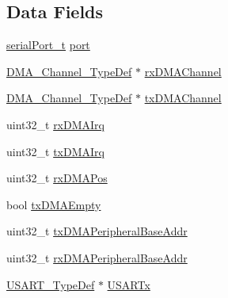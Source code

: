 \subsection*{Data Fields}
\begin{DoxyCompactItemize}
\item 
\hyperlink{drivers_2serial_8h_a64a5e2f04e1a908fbb1b3b165f88e0ef}{serial\+Port\+\_\+t} \hyperlink{structuartPort__t_ad41850c792e7215dc5e19d6850f256c3}{port}
\item 
\hyperlink{structDMA__Channel__TypeDef}{D\+M\+A\+\_\+\+Channel\+\_\+\+Type\+Def} $\ast$ \hyperlink{structuartPort__t_aab2466933b4f50a9683cf4e38b7339b2}{rx\+D\+M\+A\+Channel}
\item 
\hyperlink{structDMA__Channel__TypeDef}{D\+M\+A\+\_\+\+Channel\+\_\+\+Type\+Def} $\ast$ \hyperlink{structuartPort__t_acb3b9d625c78bfa9b6246854a0f9a7eb}{tx\+D\+M\+A\+Channel}
\item 
uint32\+\_\+t \hyperlink{structuartPort__t_a26bda335a9f5a35768510983b7c5175d}{rx\+D\+M\+A\+Irq}
\item 
uint32\+\_\+t \hyperlink{structuartPort__t_ad5a941defbe6c204095d7d675c8c3af4}{tx\+D\+M\+A\+Irq}
\item 
uint32\+\_\+t \hyperlink{structuartPort__t_a3a1dfdae4a528a8b82b9c4a45469673a}{rx\+D\+M\+A\+Pos}
\item 
bool \hyperlink{structuartPort__t_a155ee101534d5543cd5992550a8bd1cf}{tx\+D\+M\+A\+Empty}
\item 
uint32\+\_\+t \hyperlink{structuartPort__t_a25c7b6391d118dda79699e76977f69a6}{tx\+D\+M\+A\+Peripheral\+Base\+Addr}
\item 
uint32\+\_\+t \hyperlink{structuartPort__t_a21b754ebbfbf509d00ed75df5c59b3e8}{rx\+D\+M\+A\+Peripheral\+Base\+Addr}
\item 
\hyperlink{test_2unit_2platform_8h_a2b429c96c2cad510195f0627919132d7}{U\+S\+A\+R\+T\+\_\+\+Type\+Def} $\ast$ \hyperlink{structuartPort__t_aa4e600345d60273ffbc1c1e68be3f561}{U\+S\+A\+R\+Tx}
\end{DoxyCompactItemize}


